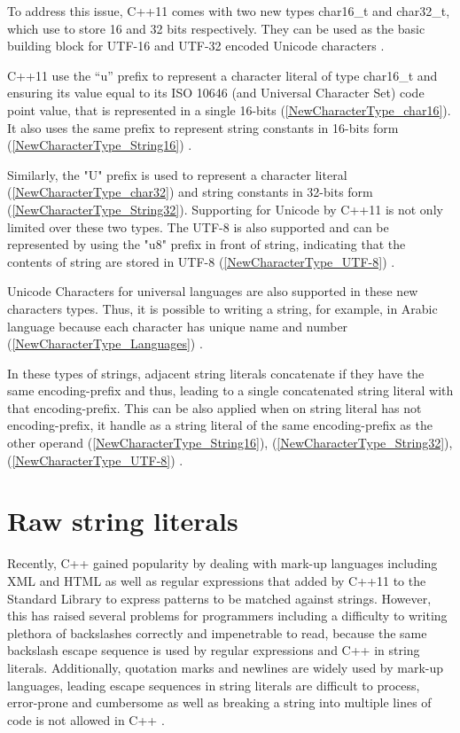 \documentclass[11pt]{report}
\begin{document}
To address this issue, C++11 comes with two new types char16\_t and char32\_t, which use to store 16 and 32 bits respectively. They can be used as the basic building block for UTF-16 and UTF-32 encoded Unicode characters \cite{Josuttis:2012:CppStandard}.


C++11 use the “u” prefix to represent a character literal of type char16\_t and ensuring its value equal to its ISO 10646 (and Universal Character Set) code point value, that is represented in a single 16-bits (\ref{NewCharacterType_char16}). It also uses the same prefix to represent string constants in 16-bits form (\ref{NewCharacterType_String16}) \cite{Josuttis:2012:CppStandard}.


Similarly, the "U" prefix is used to represent a character literal (\ref{NewCharacterType_char32}) and string constants in 32-bits form (\ref{NewCharacterType_String32}).  Supporting for Unicode by C++11 is not only limited over these two types. The UTF-8 is also supported and can be represented by using the "u8" prefix in front of string, indicating that the contents of string are stored in UTF-8 (\ref{NewCharacterType_UTF-8}) \cite{Josuttis:2012:CppStandard}.


Unicode Characters for universal languages are also supported in these new characters types. Thus, it is possible to writing a string, for example, in Arabic language because each character has unique name and number (\ref{NewCharacterType_Languages}) \cite{Josuttis:2012:CppStandard}.


In these types of strings, adjacent string literals concatenate if they have the same encoding-prefix and thus, leading to a single concatenated string literal with that encoding-prefix. This can be also applied when on string literal has not encoding-prefix, it handle as a string literal of the same encoding-prefix as the other operand (\ref{NewCharacterType_String16}), (\ref{NewCharacterType_String32}), (\ref{NewCharacterType_UTF-8}) \cite{ ISO:2011:Cpplanguage}.


\section{Raw string literals}
\label{section: Raw string literals}
Recently, C++ gained popularity by dealing with mark-up languages including XML and HTML as well as regular expressions that added by C++11 to the Standard Library to express patterns to be matched against strings. However, this has raised several problems for programmers including a difficulty to writing plethora of backslashes correctly and impenetrable to read, because the same backslash escape sequence is used by regular expressions and C++ in string literals. Additionally, quotation marks and newlines are widely used by mark-up languages, leading escape sequences in string literals are difficult to process, error-prone and cumbersome as well as breaking a string into multiple lines of code is not allowed in C++ \cite{ISO:2011:Cpplanguage}.
\end{document}

